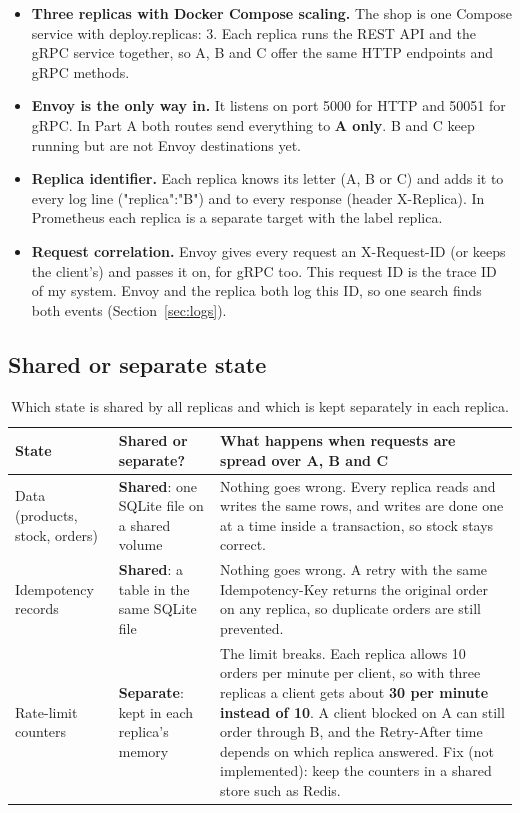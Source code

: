 \documentclass[10pt,a4paper]{article}
\newcommand{\codeus}{\textunderscore\allowbreak}
\newcommand{\code}[1]{{\small\ttfamily\let\_\codeus #1}}
\begin{document}
\begin{itemize}
\item \textbf{Three replicas with Docker Compose scaling.} The shop is one Compose service with
\code{deploy.replicas: 3}. Each replica runs the REST API and the gRPC service together, so A, B and C offer the same
HTTP endpoints and gRPC methods.
\item \textbf{Envoy is the only way in.} It listens on port 5000 for HTTP and 50051 for gRPC. In Part A both routes
send everything to \textbf{A only}. B and C keep running but are not Envoy destinations yet.
\item \textbf{Replica identifier.} Each replica knows its letter (A, B or C) and adds it to every log line
(\code{"replica":"B"}) and to every response (header \code{X-Replica}). In Prometheus each replica is a separate target
with the label \code{replica}.
\item \textbf{Request correlation.} Envoy gives every request an \code{X-Request-ID} (or keeps the client's) and
passes it on, for gRPC too. This request ID is the trace ID of my system. Envoy and the replica both log this ID, so one search finds both events
(Section~\ref{sec:logs}).
\end{itemize}

\subsection{Shared or separate state}

\begin{table}[H]
\centering\small
\begin{tabularx}{\textwidth}{@{}l l Y@{}}
\toprule
State & Shared or separate? & What happens when requests are spread over A, B and C \\
\midrule
Data (products, stock, orders) & \textbf{Shared}: one SQLite file on a shared volume &
Nothing goes wrong. Every replica reads and writes the same rows, and writes are done one at a time inside a
transaction, so stock stays correct. \\
Idempotency records & \textbf{Shared}: a table in the same SQLite file &
Nothing goes wrong. A retry with the same \code{Idempotency-Key} returns the original order on any replica, so
duplicate orders are still prevented. \\
Rate-limit counters & \textbf{Separate}: kept in each replica's memory &
The limit breaks. Each replica allows 10 orders per minute per client, so with three replicas a client gets about
\textbf{30 per minute instead of 10}. A client blocked on A can still order through B, and the
\code{Retry-After} time depends on which replica answered. Fix (not implemented): keep the counters in a shared
store such as Redis. \\
\bottomrule
\end{tabularx}
\caption{Which state is shared by all replicas and which is kept separately in each replica.}
\label{tab:state}
\end{table}
\end{document}
